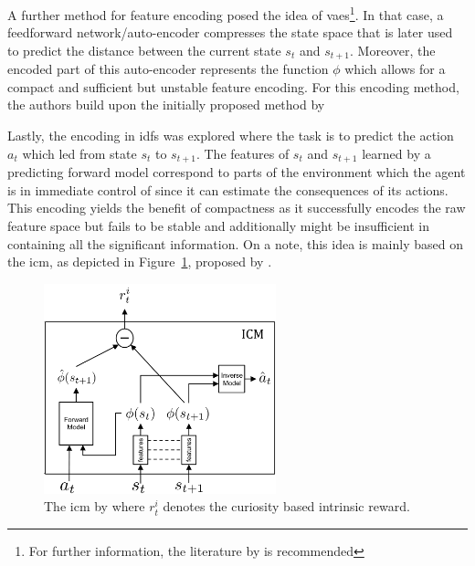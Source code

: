 \documentclass[draft,final]{vutinfth} %
\newcommand{\p}[1]{see p. #1}
\begin{document}
    A further method for feature encoding posed the idea of \glspl{vae}\footnote{For further information, the literature by \citet[\p{207-214}]{aggarwal_neural_2018} is recommended}.
    In that case, a feedforward network/auto-encoder compresses the state space that is later used to predict the distance between the current state $s_t$ and $s_{t+1}$.
    Moreover, the encoded part of this auto-encoder represents the function $\phi$ which allows for a compact and sufficient but unstable feature encoding.
    For this encoding method, the authors build upon the initially proposed method by~\citeauthor{stadie_incentivizing_2015}

    Lastly, the encoding in \glspl{idf} was explored where the task is to predict the action $a_t$ which led from state $s_t$ to $s_{t+1}$.
    The features of $s_t$ and $s_{t+1}$ learned by a predicting forward model correspond to parts of the environment which the agent is in immediate control of since it can estimate the consequences of its actions.
    This encoding yields the benefit of compactness as it successfully encodes the raw feature space but fails to be stable and additionally might be insufficient in containing all the significant information.
    On a note, this idea is mainly based on the \gls{icm}, as depicted in Figure~\ref{fig:icm}, proposed by \citet{pathak_curiosity-driven_2017-1}.

    \begin{figure}[h]
        \centering
        \includegraphics[width=0.6\textwidth]{figures/icm.png}
        \caption[The \gls{icm} introduced in ""]{The \gls{icm} by \citet{pathak_curiosity-driven_2017-1} where $r_t^i$ denotes the curiosity based intrinsic reward.\protect\footnotemark}
        \label{fig:icm}
    \end{figure}
\end{document}
